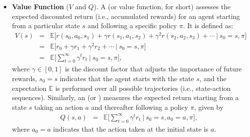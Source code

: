 \begin{itemize}
\begin{figure}[!t]
\centering

\caption{LLM as policy in reinforcement learning. At each step $t$, the LLM predicts a token $y_t$ given the model input $\mathbf{x}$ and the previously generated tokens $\mathbf{y}_{<t}$. This process can be framed as a reinforcement learning problem, where $y_t$ serves as the action, $(\mathbf{x},\mathbf{y}_{<t})$ as the state, and the predicted distribution $\Pr(y_t|\mathbf{x},\mathbf{y}_{<t})$ as the policy. The reward model evaluates the generated response and assigns reward scores, which are then used to estimate value functions such as $V(s_t)$ and $Q(s_t,a_t)$ for policy optimization. In practice, reward models in RLHF are typically defined over complete responses, although the optimization objective can still be decomposed token-wise.}
\label{fig:llm-as-policy-in-rl}
\end{figure}

\item \vspace{0.3em} \textbf{Value Function} ($V$ and $Q$). A  (or value function, for short) assesses the expected discounted return (i.e., accumulated rewards) for an agent starting from a particular state $s$ and following a specific policy $\pi$. It is defined as:
    \begin{eqnarray}
    V(s) & = & \mathbb{E} \Big[ r(s_0,a_0,s_1) + \gamma r(s_1,a_1,s_2) + \gamma^2 r(s_2,a_2,s_3) + \cdots \ \big | \ s_0 = s, \pi \Big] \nonumber \\
         & = & \mathbb{E} \Big[ r_0 + \gamma r_1 + \gamma^2 r_2 + \cdots \ \big | \ s_0 = s, \pi \Big] \nonumber \\
         & = & \mathbb{E} \Big[ \sum_{t=0}^{\infty} \gamma^{t} r_t \ \big | \ s_0 = s, \pi \Big], \label{eq:general-value-function}
    \end{eqnarray}
    \noindent where $\gamma \in [0,1]$ is the discount factor that adjusts the importance of future rewards, $s_0 = s$ indicates that the agent starts with the state $s$, and the expectation $\mathbb{E}$ is performed over all possible trajectories (i.e., state-action sequences). Similarly, an  (or ) measures the expected return starting from a state $s$ taking an action $a$ and thereafter following a policy $\pi$, given by
    \begin{eqnarray}
    Q(s,a) & = & \mathbb{E} \Big[ \sum_{t=0}^{\infty} \gamma^{t} r_t \ \big | \ s_0 = s, a_0 = a, \pi \Big],
    \end{eqnarray}
    \noindent where $a_0 = a$ indicates that the action taken at the initial state is $a$.
\end{itemize}
\vspace{0.5em}

